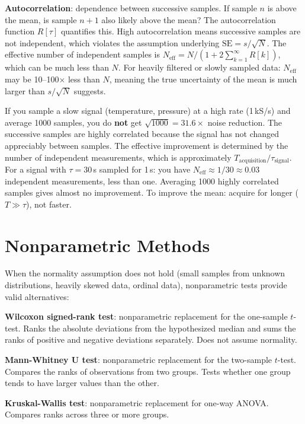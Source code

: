 \documentclass[11pt,letterpaper,twoside,openany]{book}
\begin{document}
\textbf{Autocorrelation}: dependence between successive samples. If sample $n$ is above the mean, is sample $n+1$ also likely above the mean? The autocorrelation function $R[\tau]$ quantifies this. High autocorrelation means successive samples are not independent, which violates the assumption underlying $\text{SE} = s/\sqrt{N}$. The effective number of independent samples is $N_{\text{eff}} = N / (1 + 2\sum_{k=1}^{\infty} R[k])$, which can be much less than $N$. For heavily filtered or slowly sampled data: $N_{\text{eff}}$ may be 10--100$\times$ less than $N$, meaning the true uncertainty of the mean is much larger than $s/\sqrt{N}$ suggests.

\begin{warningbox}
If you sample a slow signal (temperature, pressure) at a high rate (1\,kS/s) and average 1000 samples, you do \textbf{not} get $\sqrt{1000} = 31.6\times$ noise reduction. The successive samples are highly correlated because the signal has not changed appreciably between samples. The effective improvement is determined by the number of independent measurements, which is approximately $T_{\text{acquisition}} / \tau_{\text{signal}}$. For a signal with $\tau = 30$\,s sampled for 1\,s: you have $N_{\text{eff}} \approx 1/30 \approx 0.03$ independent measurements, less than one. Averaging 1000 highly correlated samples gives almost no improvement. To improve the mean: acquire for longer ($T \gg \tau$), not faster.
\end{warningbox}
\section{Nonparametric Methods}
When the normality assumption does not hold (small samples from unknown distributions, heavily skewed data, ordinal data), nonparametric tests provide valid alternatives:

\textbf{Wilcoxon signed-rank test}: nonparametric replacement for the one-sample $t$-test. Ranks the absolute deviations from the hypothesized median and sums the ranks of positive and negative deviations separately. Does not assume normality.

\textbf{Mann-Whitney U test}: nonparametric replacement for the two-sample $t$-test. Compares the ranks of observations from two groups. Tests whether one group tends to have larger values than the other.

\textbf{Kruskal-Wallis test}: nonparametric replacement for one-way ANOVA. Compares ranks across three or more groups.
\end{document}
